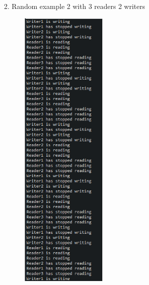 \documentclass[14pt]{article}
\begin{document}
\begin{center}
2. Random example 2 with 3 readers 2 writers\\
\vspace{10mm}

\includegraphics[height=5.5in, width = 2.5in]{rw2.png}\\
\end{center}\\
\newpage{}
\end{document}
